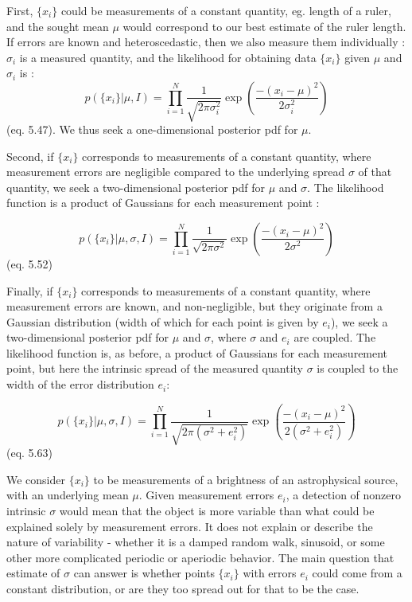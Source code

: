 \documentclass[fleqn,usenatbib]{mnras}  %
\begin{document}
First, $\{x_{i}\}$ could be measurements of a constant quantity, eg. length of a ruler, and the sought mean $\mu$ would correspond to our best estimate of the ruler length. If errors are known and heteroscedastic, then we also measure  them individually : $\sigma_{i}$ is a measured quantity, and the likelihood for obtaining data $\{x_{i}\}$ given $\mu$  and $\sigma_{i}$ is :
\begin{equation}
p(\{x_{i}\}| \mu, I) = \prod_{i=1}^{N}{\frac{1}{\sqrt{2\pi \sigma_{i}^{2}}} \exp{\left(\frac{-(x_{i}-\mu)^{2}}{2\sigma^{2}_{i}}\right)}}
\end{equation}
(eq. 5.47). We thus seek a one-dimensional posterior pdf for $\mu$. 

Second,  if $\{x_{i}\}$ corresponds to measurements of a constant quantity, where measurement errors are negligible compared to the underlying spread $\sigma$ of that quantity, we seek a two-dimensional posterior pdf for $\mu$ and $\sigma$. The likelihood function is a product of Gaussians for each measurement point : 

\begin{equation}
p(\{x_{i}\}| \mu, \sigma, I) = \prod_{i=1}^{N}{\frac{1}{\sqrt{2\pi \sigma^{2}}} \exp{\left(\frac{-(x_{i}-\mu)^{2}}{2\sigma^{2}}\right)}}
\end{equation}
(eq. 5.52)

Finally, if $\{x_{i}\}$  corresponds to measurements of a constant quantity, where measurement errors are known, and non-negligible, but they originate from a Gaussian distribution (width of which for each point is given by $e_{i}$), we seek a two-dimensional posterior pdf for $\mu$ and $\sigma$, where $\sigma$ and $e_{i}$ are coupled. The likelihood function is, as before, a product of Gaussians for each measurement point, but here the intrinsic spread of the measured quantity $\sigma$ is coupled to the width of the error distribution $e_{i}$:

\begin{equation}
p(\{x_{i}\}| \mu, \sigma, I) = \prod_{i=1}^{N}{\frac{1}{\sqrt{2\pi (\sigma^{2} + e_{i}^{2})}} \exp{\left(\frac{-(x_{i}-\mu)^{2}}{2(\sigma^{2} + e_{i}^{2})}\right)}}
\end{equation}
(eq. 5.63)

We consider $\{x_{i}\}$ to be measurements of a brightness of an astrophysical source, with an underlying mean 
 $\mu$. Given measurement errors $e_{i}$, a detection of nonzero intrinsic $\sigma$ would mean that the object is more variable than what could be explained solely by measurement errors.  It does not explain or describe the nature of variability - whether it is a damped random walk, sinusoid, or some other more complicated periodic or aperiodic behavior. The main question that estimate of $\sigma$ can answer is whether points $\{x_{i}\}$  with errors $e_{i}$ could come from a constant distribution, or are they too spread out for that to be the case.  
\end{document}
